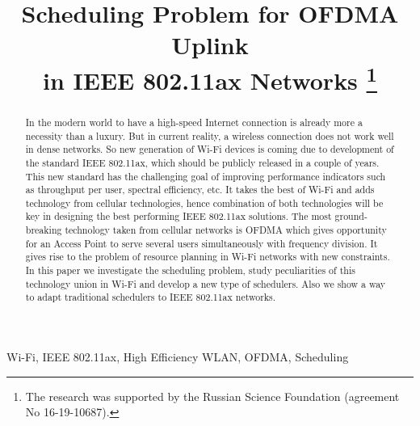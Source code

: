 
%


\IEEEoverridecommandlockouts

\title{%
Scheduling Problem for OFDMA Uplink \\in IEEE 802.11ax Networks
\thanks{The research was supported by the Russian Science Foundation (agreement No 16-19-10687).}}

\author{
}

\maketitle

\begin{abstract}
In the modern world to have a high-speed Internet connection is already more a necessity than a luxury. 
But in current reality, a wireless connection does not work well in dense networks. 
So new generation of Wi-Fi devices is coming due to development of the standard IEEE 802.11ax, which should be publicly released in a couple of years. 
This new standard has the challenging goal of improving performance indicators such as throughput per user, spectral efficiency, etc. 
It takes the best of Wi-Fi and adds technology from cellular technologies, hence combination of both technologies will be key in designing the best performing IEEE 802.11ax solutions. 
The most ground-breaking technology taken from cellular networks is OFDMA which gives opportunity for an Access Point to serve several users simultaneously with frequency division. 
It gives rise to the problem of resource planning in Wi-Fi networks with new constraints.
In this paper we investigate the scheduling problem, study peculiarities of this technology union in Wi-Fi and develop a new type of schedulers.
Also we show a way to adapt traditional schedulers to  IEEE 802.11ax networks.
\end{abstract}

\begin{IEEEkeywords}
Wi-Fi, IEEE 802.11ax, High Efficiency WLAN, OFDMA, Scheduling
\end{IEEEkeywords}

